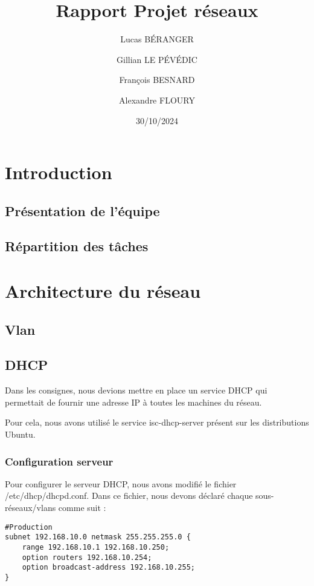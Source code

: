 \documentclass[a4paper,12pt]{report}
\title{Rapport Projet réseaux}
\author{
    Lucas BÉRANGER \and 
    Gillian LE PÉVÉDIC \and
    François BESNARD \and
    Alexandre FLOURY \and
}
\date{30/10/2024}
\begin{document}
    \maketitle  
    \newpage

    \tableofcontents
    \newpage

    \chapter{Introduction}
        \section{Présentation de l'équipe}
        \section{Répartition des tâches}


    \chapter{Architecture du réseau}
        \section{Vlan}
        \section{DHCP}
            Dans les consignes, nous devions mettre en place un service DHCP qui permettait de fournir une adresse IP à toutes les machines du réseau. 
            
            Pour cela, nous avons utilisé le service isc-dhcp-server présent sur les distributions Ubuntu.
            \subsection{Configuration serveur}
                Pour configurer le serveur DHCP, nous avons modifié le fichier /etc/dhcp/dhcpd.conf. 
                Dans ce fichier, nous devons déclaré chaque sous-réseaux/vlans comme suit :
                
                    \begin{verbatim}
#Production
subnet 192.168.10.0 netmask 255.255.255.0 {
    range 192.168.10.1 192.168.10.250;
    option routers 192.168.10.254;
    option broadcast-address 192.168.10.255;
}
                    \end{verbatim}
                
\end{document}
